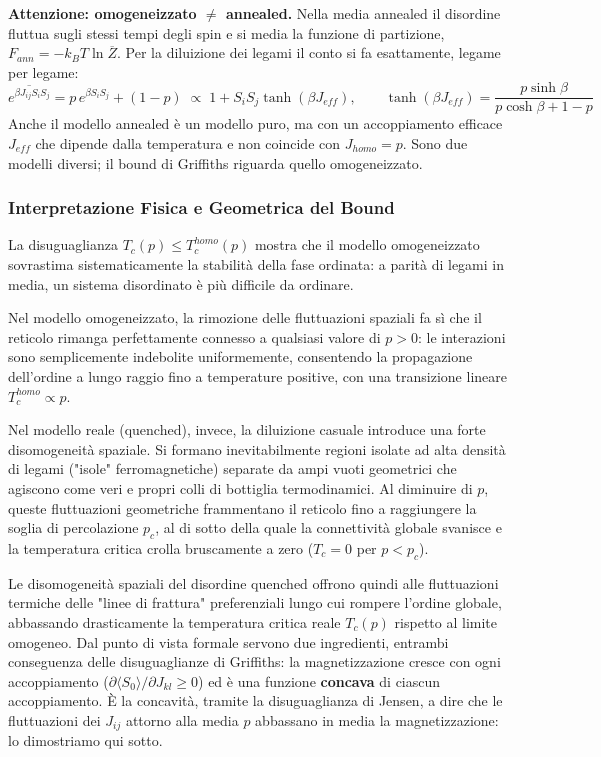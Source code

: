 \noindent\textbf{Attenzione: omogeneizzato $\neq$ annealed.} Nella media annealed il disordine fluttua sugli stessi tempi degli spin e si media la funzione di partizione, $F_{ann} = -k_B T \ln \overline{Z}$. Per la diluizione dei legami il conto si fa esattamente, legame per legame:
\begin{equation}
\overline{e^{\beta J_{ij} S_i S_j}} = p\, e^{\beta S_i S_j} + (1-p) \;\propto\; 1 + S_i S_j \tanh(\beta J_{eff}), \qquad \tanh(\beta J_{eff}) = \frac{p \sinh \beta}{p \cosh \beta + 1 - p}
\end{equation}
Anche il modello annealed è un modello puro, ma con un accoppiamento efficace $J_{eff}$ che dipende dalla temperatura e non coincide con $J_{homo} = p$. Sono due modelli diversi; il bound di Griffiths riguarda quello omogeneizzato.

\subsubsection*{Interpretazione Fisica e Geometrica del Bound}

La disuguaglianza $T_c(p) \le T_c^{homo}(p)$ mostra che il modello omogeneizzato sovrastima sistematicamente la stabilità della fase ordinata: a parità di legami in media, un sistema disordinato è più difficile da ordinare.

Nel modello omogeneizzato, la rimozione delle fluttuazioni spaziali fa sì che il reticolo rimanga perfettamente connesso a qualsiasi valore di $p > 0$: le interazioni sono semplicemente indebolite uniformemente, consentendo la propagazione dell'ordine a lungo raggio fino a temperature positive, con una transizione lineare $T_c^{homo} \propto p$. 

Nel modello reale (quenched), invece, la diluizione casuale introduce una forte disomogeneità spaziale. Si formano inevitabilmente regioni isolate ad alta densità di legami ("isole" ferromagnetiche) separate da ampi vuoti geometrici che agiscono come veri e propri colli di bottiglia termodinamici. Al diminuire di $p$, queste fluttuazioni geometriche frammentano il reticolo fino a raggiungere la soglia di percolazione $p_c$, al di sotto della quale la connettività globale svanisce e la temperatura critica crolla bruscamente a zero ($T_c = 0$ per $p < p_c$). 

Le disomogeneità spaziali del disordine quenched offrono quindi alle fluttuazioni termiche delle "linee di frattura" preferenziali lungo cui rompere l'ordine globale, abbassando drasticamente la temperatura critica reale $T_c(p)$ rispetto al limite omogeneo. Dal punto di vista formale servono due ingredienti, entrambi conseguenza delle disuguaglianze di Griffiths: la magnetizzazione cresce con ogni accoppiamento ($\partial \langle S_0 \rangle / \partial J_{kl} \ge 0$) ed è una funzione \textbf{concava} di ciascun accoppiamento. È la concavità, tramite la disuguaglianza di Jensen, a dire che le fluttuazioni dei $J_{ij}$ attorno alla media $p$ abbassano in media la magnetizzazione: lo dimostriamo qui sotto.


